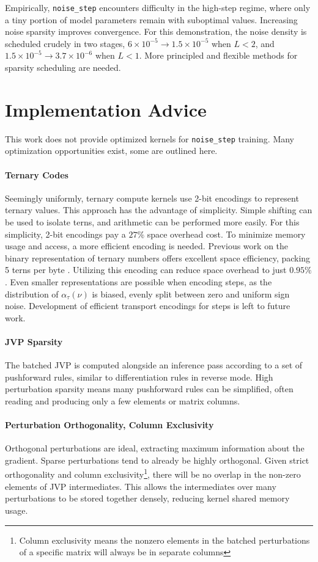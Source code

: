 \documentclass{article}
\begin{document}
Empirically, \texttt{noise\_step} encounters difficulty in the high-step regime, where only a tiny portion of model parameters remain with suboptimal values.
Increasing noise sparsity improves convergence. 
For this demonstration, the noise density is scheduled crudely in two stages, $6 \times 10^{-5} \rightarrow 1.5 \times 10^{-5}$ when $L < 2$, and $1.5 \times 10^{-5} \rightarrow 3.7 \times 10^{-6}$ when $L < 1$.
More principled and flexible methods for sparsity scheduling are needed.

\section{Implementation Advice}
This work does not provide optimized kernels for \texttt{noise\_step} training. Many optimization opportunities exist, some are outlined here.
\paragraph{Ternary Codes}
Seemingly uniformly, ternary compute kernels use 2-bit encodings to represent ternary values. 
This approach has the advantage of simplicity. Simple shifting can be used to isolate terns, and arithmetic can be performed more easily.
For this simplicity, 2-bit encodings pay a $27\%$ space overhead cost. To minimize memory usage and access, a more efficient encoding is needed.
Previous work on the binary representation of ternary numbers offers excellent space efficiency, packing 5 terns per byte \cite{muller2019}.
Utilizing this encoding can reduce space overhead to just $0.95\%$. 
Even smaller representations are possible when encoding steps, as the distribution of $\alpha_\tau(\nu)$ is biased, evenly split between zero and uniform sign noise.
Development of efficient transport encodings for steps is left to future work.

\paragraph{JVP Sparsity}
The batched JVP is computed alongside an inference pass according to a set of pushforward rules, similar to differentiation rules in reverse mode.
High perturbation sparsity means many pushforward rules can be simplified, often reading and producing only a few elements or matrix columns.

\newpage
\paragraph{Perturbation Orthogonality, Column Exclusivity}
Orthogonal perturbations are ideal, extracting maximum information about the gradient. Sparse perturbations tend to already be highly orthogonal. %
Given strict orthogonality and column exclusivity\footnote{Column exclusivity means the nonzero elements in the batched perturbations of a specific matrix will always be in separate columns}, there will be no overlap in the non-zero elements of JVP intermediates. 
This allows the intermediates over many perturbations to be stored together densely, reducing kernel shared memory usage.
\end{document}
